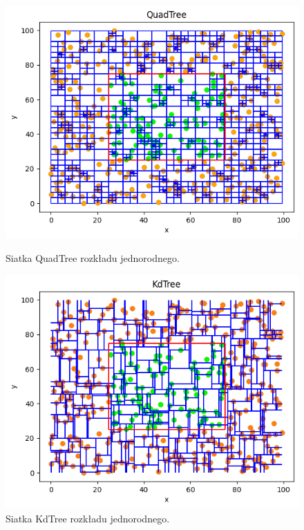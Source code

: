 \documentclass{lab}
\begin{document}
\begin{figure}[H]
  \centering
  \begin{minipage}{0.495\textwidth}
      \centering
      \includegraphics[width=1\textwidth]{resources/uniform_QuadTree.png}
      \caption{Siatka QuadTree rozkładu jednorodnego.}
      \label{fig:uniform_QuadTree}
  \end{minipage}
  \begin{minipage}{0.495\textwidth}
      \centering
      \includegraphics[width=1\textwidth]{resources/uniform_KdTree.png}
      \caption{Siatka KdTree rozkładu jednorodnego.}
      \label{fig:uniform_KdTree}
  \end{minipage}
\end{figure}
\end{document}
